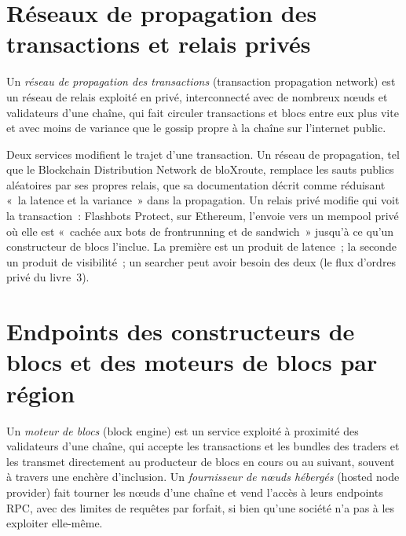 \section{Réseaux de propagation des transactions et relais privés}

\begin{definition}\label{def:nw:on-chain-connectivity:tpn}
Un \emph{réseau de propagation des transactions} (transaction propagation network) est un réseau de relais exploité en privé, interconnecté avec de nombreux nœuds
et validateurs d'une chaîne, qui fait circuler transactions et blocs entre eux plus vite et avec moins de variance que le gossip propre à la chaîne sur
l'internet public.
\end{definition}

Deux services modifient le trajet d'une transaction. Un réseau de propagation, tel que le Blockchain Distribution Network de bloXroute, remplace les sauts publics aléatoires
par ses propres relais, que sa documentation décrit comme réduisant «~la latence et la variance~» dans la propagation. Un relais privé modifie qui voit
la transaction~: Flashbots Protect, sur Ethereum, l'envoie vers un mempool privé où elle est «~cachée aux bots de frontrunning et de sandwich~» jusqu'à ce qu'un
constructeur de blocs l'inclue. La première est un produit de latence~; la seconde un produit de visibilité~; un searcher peut avoir besoin des deux (le flux d'ordres privé du livre~3).

\section{Endpoints des constructeurs de blocs et des moteurs de blocs par région}

\begin{definition}\label{def:nw:on-chain-connectivity:engine}
Un \emph{moteur de blocs} (block engine) est un service exploité à proximité des validateurs d'une chaîne, qui accepte les transactions et les bundles des traders et
les transmet directement au producteur de blocs en cours ou au suivant, souvent à travers une enchère d'inclusion. Un
\emph{fournisseur de nœuds hébergés} (hosted node provider) fait tourner les nœuds d'une chaîne et vend l'accès à leurs endpoints RPC, avec des limites de requêtes par forfait, si bien qu'une société n'a pas à les exploiter elle-même.
\end{definition}

